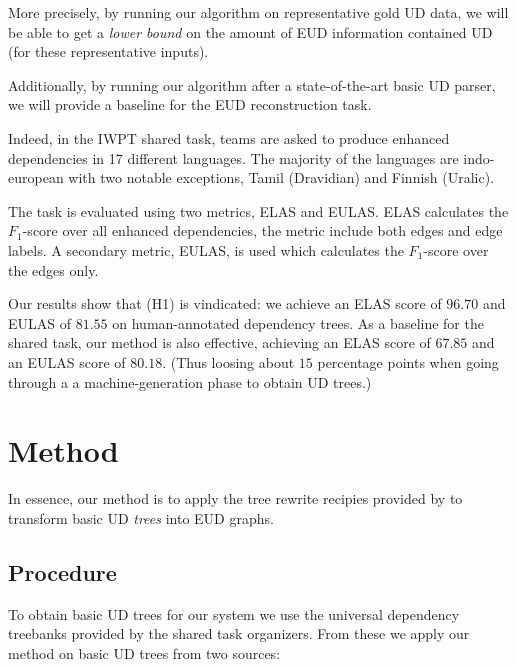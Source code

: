 \documentclass[11pt,a4paper]{article}
\begin{document}
More precisely, by running our algorithm on representative gold UD
data, we will be able to get a \emph{lower bound} on the amount of EUD
information contained UD (for these representative inputs).

Additionally, by running our algorithm after a state-of-the-art basic UD
parser, we will provide a baseline for the EUD reconstruction task.


Indeed, in the IWPT shared task, teams are asked to produce enhanced
dependencies in 17 different languages. The
majority of the languages are indo-european with two notable
exceptions, Tamil (Dravidian) and Finnish (Uralic).

The task is evaluated using two metrics, ELAS and EULAS. ELAS
calculates the $F_1$-score over all enhanced dependencies, the
metric include both edges and edge labels. A secondary metric,
EULAS, is used which calculates the $F_1$-score over the edges
only.


Our results show that (H1) is vindicated: we achieve an ELAS score of
$96.70$ and EULAS of $81.55$ on human-annotated dependency trees.  As
a baseline for the shared task, our method is also effective,
achieving an ELAS score of $67.85$ and an EULAS score of
$80.18$. (Thus loosing about $15$ percentage points when going through
a a machine-generation phase to obtain UD trees.)

\section{Method}
In essence, our method is to apply the tree rewrite recipies
provided by \citet{schuster2016enhanced} to transform basic UD
\emph{trees} into EUD graphs.   


\subsection{Procedure} 
To obtain basic UD trees for our system we use the universal
dependency treebanks provided by the shared task organizers. From
these we apply our method on basic UD trees from two sources:
\end{document}
